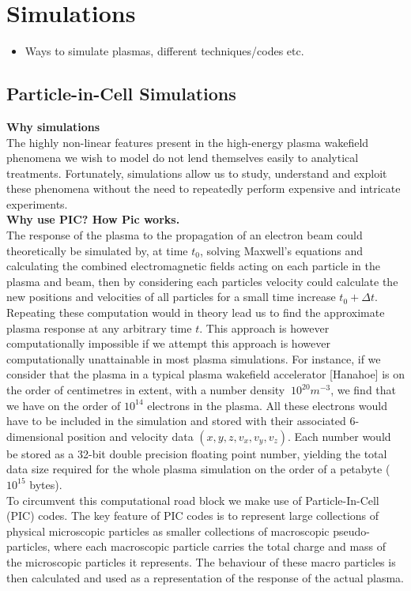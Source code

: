 \chapter{Simulations}
\begin{itemize}
\item Ways to simulate plasmas, different techniques/codes etc.
\end{itemize}
\section{Particle-in-Cell Simulations}
\textbf{Why simulations}\\
The highly non-linear features present in the high-energy plasma wakefield phenomena we wish to model do not lend themselves easily to analytical treatments. Fortunately, simulations allow us to study, understand and exploit these phenomena without the need to repeatedly perform expensive and intricate experiments.\\
\textbf{Why use PIC? How Pic works.}\\
The response of the plasma to the propagation of an electron beam could theoretically be simulated by, at time $t_0$, solving Maxwell's equations and calculating the combined electromagnetic fields acting on each particle in the plasma and beam, then by considering each particles velocity could calculate the new positions and velocities of all particles for a small time increase $t_0+\Delta t$. Repeating these computation would in theory lead us to find the approximate plasma response at any arbitrary time $t$. This approach is however computationally impossible if we attempt this approach is however computationally unattainable in most plasma simulations. For instance, if we consider that the plasma in a typical plasma wakefield accelerator [Hanahoe] is on the order of centimetres in extent, with a number density $~10^{20} m^{-3}$, we find that we have on the order of $10^{14}$ electrons in the plasma. All these electrons would have to be included in the simulation and stored with their associated 6-dimensional position and velocity data $(x,y,z,v_x,v_y,v_z)$. Each number would be stored as a 32-bit double precision floating point number, yielding the total data size required for the whole plasma simulation on the order of a petabyte ($10^{15}$ bytes).\\
\indent To circumvent this computational road block we make use of Particle-In-Cell (PIC) codes. The key feature of PIC codes is to represent large collections of physical microscopic particles as smaller collections of macroscopic pseudo-particles, where each macroscopic particle carries the total charge and mass of the microscopic particles it represents. The behaviour of these macro particles is then calculated and used as a representation of the response of the actual plasma. 

